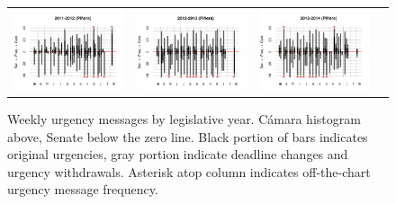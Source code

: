 \documentclass[letter,12pt]{article}
\begin{document}
\begin{figure}
\begin{center}
\begin{tabular}{cccc}
    \includegraphics[width=.22\columnwidth]{../graphs/urgenciasHistog2011.pdf} &
    \includegraphics[width=.22\columnwidth]{../graphs/urgenciasHistog2012.pdf} &
    \includegraphics[width=.22\columnwidth]{../graphs/urgenciasHistog2013.pdf} \\
\end{tabular}
  \caption{Weekly urgency messages by legislative year. C\'amara histogram above, Senate below the zero line. Black portion of bars indicates original urgencies, gray portion indicate deadline changes and urgency withdrawals. Asterisk atop column indicates off-the-chart urgency message frequency.}\label{f:depvarHistog}
\end{center}
\end{figure}

\end{document}
